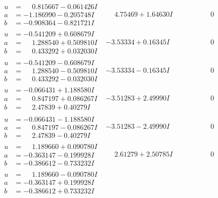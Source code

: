 \documentclass[1p]{elsarticle_modified}
\theoremstyle{definition}
\begin{document}
$$\begin{array}{c|c|c}
\begin{aligned}
u &= \phantom{-}0.815667 - 0.061426 I \\
a &= -1.186990 - 0.205748 I \\
b &= -0.908364 - 0.821721 I\end{aligned}
 & \phantom{-}4.75469 + 1.64630 I & \phantom{-0.000000 } 0 \\ \hline\begin{aligned}
u &= -0.541209 + 0.608679 I \\
a &= \phantom{-}1.288540 + 0.509810 I \\
b &= \phantom{-}0.433292 + 0.032030 I\end{aligned}
 & -3.53334 + 0.16345 I & \phantom{-0.000000 } 0 \\ \hline\begin{aligned}
u &= -0.541209 - 0.608679 I \\
a &= \phantom{-}1.288540 - 0.509810 I \\
b &= \phantom{-}0.433292 - 0.032030 I\end{aligned}
 & -3.53334 - 0.16345 I & \phantom{-0.000000 } 0 \\ \hline\begin{aligned}
u &= -0.066431 + 1.188580 I \\
a &= \phantom{-}0.847197 + 0.086267 I \\
b &= \phantom{-}2.47839 + 0.40279 I\end{aligned}
 & -3.51283 + 2.49990 I & \phantom{-0.000000 } 0 \\ \hline\begin{aligned}
u &= -0.066431 - 1.188580 I \\
a &= \phantom{-}0.847197 - 0.086267 I \\
b &= \phantom{-}2.47839 - 0.40279 I\end{aligned}
 & -3.51283 - 2.49990 I & \phantom{-0.000000 } 0 \\ \hline\begin{aligned}
u &= \phantom{-}1.189660 + 0.090780 I \\
a &= -0.363147 - 0.199928 I \\
b &= -0.386612 - 0.733232 I\end{aligned}
 & \phantom{-}2.61279 + 2.50785 I & \phantom{-0.000000 } 0 \\ \hline\begin{aligned}
u &= \phantom{-}1.189660 - 0.090780 I \\
a &= -0.363147 + 0.199928 I \\
b &= -0.386612 + 0.733232 I\end{aligned}

\end{array}$$
\end{document}
